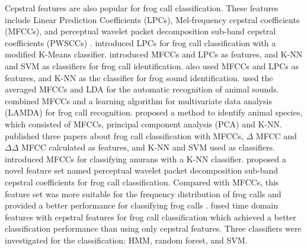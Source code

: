 Cepstral features are also popular for frog call classification. These features include Linear Prediction Coefficients (LPCs), Mel-frequency cepstral coefficients (MFCCs), and perceptual wavelet packet decomposition sub-band cepstral coefficients (PWSCCs) \citep{jie2015escience}. 
\cite{colombia2009frogs} introduced LPCs for frog call classification with a modified K-Means classifier. \cite{jaafarcomparative} introduced MFCCs and LPCs as features, and K-NN and SVM as classifiers for frog call identification. \cite{yuan2012frog} also used MFCCs and LPCs as features, and K-NN as the classifier for frog sound identification.
\cite{lee2006automatic} used the averaged MFCCs and LDA for the automatic recognition of animal sounds. \cite{bedoya2014automatic} combined MFCCs and a learning algorithm for multivariate data analysis (LAMDA) for frog call recognition. \cite{vaca2010using} proposed a method to identify animal species, which consisted of MFCCs, principal component analysis (PCA) and K-NN. \cite{jaafar2013, jaafar2013mfcc, tanintelligent2014} published three papers about frog call classification with MFCCs, $\Delta$ MFCC and $\Delta \Delta$ MFCC calculated as features, and K-NN and SVM used as classifiers. \cite{feature2012Colona} introduced MFCCs for classifying anurans with a K-NN classifier.
\cite{jie2015escience} proposed a novel feature set named perceptual wavelet packet decomposition sub-band cepstral coefficients for frog call classification. Compared with MFCCs, this feature set was more suitable for the frequency distribution of frog calls and provided a better performance for classifying frog calls . \cite{Noda2016100} fused time domain features with cepstral features for frog call classification which achieved a better classification performance than using only cepstral features. Three classifiers were investigated for the classification: HMM, random forest, and SVM.


